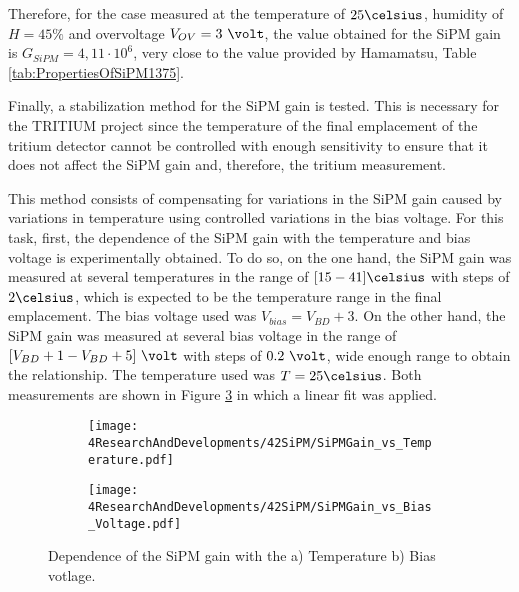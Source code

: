 Therefore, for the case measured at the temperature of $25\celsius$, humidity of $H=45\%$ and overvoltage $V_{OV}=3~\volt$, the value obtained for the SiPM gain is $G_{SiPM}=4,11\cdot{} 10^{6}$, very close to the value provided by Hamamatsu, Table \ref{tab:PropertiesOfSiPM1375}.

Finally, a stabilization method for the SiPM gain is tested. This is necessary for the TRITIUM project since the temperature of the final emplacement of the tritium detector cannot be controlled with enough sensitivity to ensure that it does not affect the SiPM gain and, therefore, the tritium measurement. 

This method consists of compensating for variations in the SiPM gain caused by variations in temperature using controlled variations in the bias voltage. For this task, first, the dependence of the SiPM gain with the temperature and bias voltage is experimentally obtained. To do so, on the one hand, the SiPM gain was measured at several temperatures in the range of $[15-41]\celsius$ with steps of $2\celsius$, which is expected to be the temperature range in the final emplacement. The bias voltage used was $V_{bias} = V_{BD}+3$. On the other hand, the SiPM gain was measured at several bias voltage in the range of $[V_{BD}+1-V_{BD}+5]~\volt$ with steps of $0.2~\volt$, wide enough range to obtain the relationship. The temperature used was $T=25\celsius$. Both measurements are shown in Figure \ref{fig:SiPMGainDependance} in which a linear fit was applied. 

\begin{figure}
\centering
    \begin{subfigure}[b]{0.5\textwidth}
    \centering
    \texttt{[image: 4ResearchAndDevelopments/42SiPM/SiPMGain\_vs\_Temperature.pdf]}  
    \caption{\label{subfig:SiPMGainvsTemperature}}
    \end{subfigure}
    \hfill
    \begin{subfigure}[b]{0.45\textwidth}
    \centering
    \texttt{[image: 4ResearchAndDevelopments/42SiPM/SiPMGain\_vs\_Bias\_Voltage.pdf]}  
    \caption{\label{subfig:SiPMGainvsBiasVoltage}}
    \end{subfigure}
 \caption{Dependence of the SiPM gain with the a) Temperature b) Bias votlage.}
 \label{fig:SiPMGainDependance}
\end{figure}

